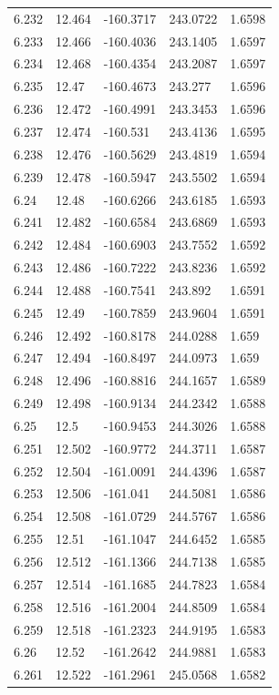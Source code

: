 \begin{tabular}{lllll}
6.232 & 12.464 & -160.3717 & 243.0722 & 1.6598 \\
6.233 & 12.466 & -160.4036 & 243.1405 & 1.6597 \\
6.234 & 12.468 & -160.4354 & 243.2087 & 1.6597 \\
6.235 & 12.47 & -160.4673 & 243.277 & 1.6596 \\
6.236 & 12.472 & -160.4991 & 243.3453 & 1.6596 \\
6.237 & 12.474 & -160.531 & 243.4136 & 1.6595 \\
6.238 & 12.476 & -160.5629 & 243.4819 & 1.6594 \\
6.239 & 12.478 & -160.5947 & 243.5502 & 1.6594 \\
6.24 & 12.48 & -160.6266 & 243.6185 & 1.6593 \\
6.241 & 12.482 & -160.6584 & 243.6869 & 1.6593 \\
6.242 & 12.484 & -160.6903 & 243.7552 & 1.6592 \\
6.243 & 12.486 & -160.7222 & 243.8236 & 1.6592 \\
6.244 & 12.488 & -160.7541 & 243.892 & 1.6591 \\
6.245 & 12.49 & -160.7859 & 243.9604 & 1.6591 \\
6.246 & 12.492 & -160.8178 & 244.0288 & 1.659 \\
6.247 & 12.494 & -160.8497 & 244.0973 & 1.659 \\
6.248 & 12.496 & -160.8816 & 244.1657 & 1.6589 \\
6.249 & 12.498 & -160.9134 & 244.2342 & 1.6588 \\
6.25 & 12.5 & -160.9453 & 244.3026 & 1.6588 \\
6.251 & 12.502 & -160.9772 & 244.3711 & 1.6587 \\
6.252 & 12.504 & -161.0091 & 244.4396 & 1.6587 \\
6.253 & 12.506 & -161.041 & 244.5081 & 1.6586 \\
6.254 & 12.508 & -161.0729 & 244.5767 & 1.6586 \\
6.255 & 12.51 & -161.1047 & 244.6452 & 1.6585 \\
6.256 & 12.512 & -161.1366 & 244.7138 & 1.6585 \\
6.257 & 12.514 & -161.1685 & 244.7823 & 1.6584 \\
6.258 & 12.516 & -161.2004 & 244.8509 & 1.6584 \\
6.259 & 12.518 & -161.2323 & 244.9195 & 1.6583 \\
6.26 & 12.52 & -161.2642 & 244.9881 & 1.6583 \\
6.261 & 12.522 & -161.2961 & 245.0568 & 1.6582 \\

\end{tabular}
